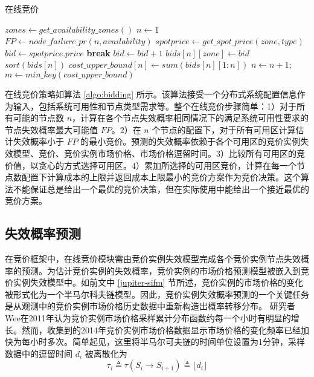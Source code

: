 \begin{algorithm}
\caption{在线竞价}
\label{algo:bidding}
$zones\gets get\_availability\_zones()$\;
$n\gets 1$\;
{
  $FP\gets node\_failure\_pr(n, availability)$\;
  {
    $spotprice\gets get\_spot\_price(zone, type)$\;
    $bid\gets spotprice.price$\;
    {
      {
        \textbf{break}\;
      }{
        $bid\gets bid + 1$\;
      }
    }
    $bids[n][zone]\gets bid$\;
  }
  $sort(bids[n])$\;
  $cost\_upper\_bound[n]\gets sum(bids[n][1:n])$\;
  $n\gets n + 1$;\
}
$m\gets min\_key(cost\_upper\_bound)$\;
\end{algorithm}

在线竞价策略如算法 \ref{algo:bidding} 所示。该算法接受一个分布式系统配置信息作为输入，包括系统可用性和节点类型需求等。整个在线竞价步骤简单：1）对于所有可能的节点数 $n$，计算在各个节点失效概率相同情况下的满足系统可用性要求的节点失效概率最大可能值 $FP$。2）在 $n$ 个节点的配置下，对于所有可用区计算估计失效概率小于 $FP$ 的最小竞价。预测的失效概率依赖于各个可用区的竞价实例失效模型、竞价、竞价实例市场价格、市场价格逗留时间。3）比较所有可用区的竞价值，以贪心的方式选择可用区。4）累加所选择的可用区竞价，计算在每一个节点数配置下计算成本的上限并返回成本上限最小的竞价方案作为竞价决策。这个算法不能保证总是给出一个最优的竞价决策，但在实际使用中能给出一个接近最优的竞价方案。

\subsection{失效概率预测}
在竞价框架中，在线竞价模块需由竞价实例失效模型完成各个竞价实例节点失效概率的预测。为估计竞价实例的失效概率，竞价实例的市场价格预测模型被嵌入到竞价实例失效模型中。如前文中 \ref{jupiter-sifm} 节所述，竞价实例的市场价格的变化被形式化为一个半马尔科夫链模型。因此，竞价实例失效概率预测的一个关键任务是从观测中的竞价实例市场价格历史数据中重新构造出概率转移分布。
研究者Wee\cite{5948651}在2011年认为竞价实例市场价格采样累计分布函数约每一个小时有明显的增长。然而，收集到的2014年竞价实例市场价格数据显示市场价格的变化频率已经加快为每小时多次。简单起见，这里将半马尔可夫链的时间单位设置为1分钟，采样数据中的逗留时间 $d_i$ 被离散化为
\begin{equation}
\tau_i \triangleq \tau(S_i \rightarrow S_{i+1}) \triangleq \lfloor d_i \rfloor
\end{equation}

